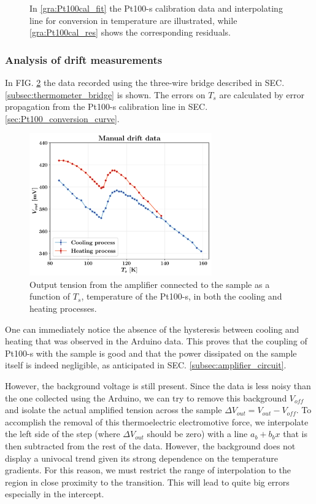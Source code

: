 \documentclass[rmp,10pt,onecolumn,fleqn,notitlepage]{revtex4-1}
\begin{document}
\begin{figure}[H]
\begin{minipage}[]{0.49\linewidth}
\end{minipage}
\caption{\label{gra:Pt100cal} In \ref{gra:Pt100cal_fit} the Pt100-s calibration data and interpolating line for conversion in temperature are illustrated, while \ref{gra:Pt100cal_res} shows the corresponding residuals. }
\end{figure}


\subsubsection{Analysis of drift measurements}
\label{subsubsec:drift_measurement}

In FIG. \ref{fig:mandat} the data recorded using the three-wire bridge described in SEC. \ref{subsec:thermometer_bridge} is shown. The errors on $T_s$ are calculated by error propagation from the Pt100-s  calibration line in SEC. \ref{sec:Pt100_conversion_curve}. 

\begin{figure}[H]
    \centering
   \includegraphics[width=0.7\textwidth]{image/drift_plots/drift_data.pdf}
    \caption{Output tension from the amplifier connected to the sample as a function of $T_s$, temperature of the Pt100-s, in both the cooling and heating processes.}
    \label{fig:mandat}
\end{figure}

\pagebreak

One can immediately notice the absence of the hysteresis between cooling and heating that was observed in the Arduino data. This proves that the coupling of Pt100-s with the sample is good and that the power dissipated on the sample itself is indeed negligible, as anticipated in SEC. \ref{subsec:amplifier_circuit}. 
 
However, the background voltage is still present. Since the data is less noisy than the one collected using the Arduino, we can try to remove this background $V_{off}$ and isolate the actual amplified tension across the sample $\Delta V_{out} = V_{out} - V_{off}$. 
To accomplish the removal of this thermoelectric electromotive force, we interpolate the left side of the step (where $\Delta V_{out}$ should be zero) with a line $a_b + b_b x$ that is then subtracted from the rest of the data. However, the background does not display a univocal trend given its strong dependence on the temperature gradients. For this reason, we must restrict the range of interpolation to the region in close proximity to the transition. This will lead to quite big errors especially in the intercept. 
\end{document}
